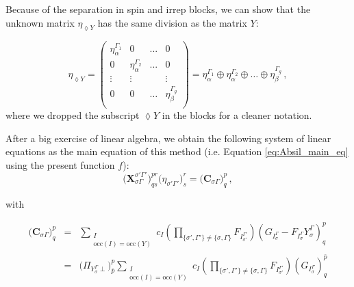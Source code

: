 \documentclass[a4paper,11pt]{article}
\begin{document}
Because of the separation in spin and irrep blocks, we can show that the unknown matrix $\eta_{\lozenge Y}$ has the same division as the matrix $Y$:

\begin{equation}\label{eq:eta_spin_irrep_blocks}
  \eta_{\lozenge Y} =
  \begin{pmatrix}
    \eta_\alpha^{\Gamma_1} & 0 & ... & 0\\
    0 & \eta_\alpha^{\Gamma_2} & ... & 0 \\
    \vdots & \vdots & & \vdots\\
    0 & 0 &\dots & \eta_\beta^{\Gamma_g}\\
  \end{pmatrix}
  = \eta_\alpha^{\Gamma_1} \oplus \eta_\alpha^{\Gamma_2} \oplus \dots \oplus \eta_\beta^{\Gamma_g}\,,
\end{equation}
where we dropped the subscript $\lozenge Y$ in the blocks for a cleaner notation.

After a big exercise of linear algebra, we obtain the following system of linear equations as the main equation of this method (i.e. Equation \ref{eq:Absil_main_eq} using the present function $f$):
\begin{equation}
  \big( \mathbf{X}_{\sigma \Gamma}^{\sigma' \Gamma'} \big)^{pr}_{qs} \big( \eta_{\sigma' \Gamma'} \big)^r_s
  = \big( \mathbf{C}_{\sigma \Gamma} \big)^p_q\,,
\end{equation}

with

\begin{eqnarray}
  \big( \mathbf{C}_{\sigma \Gamma} \big)^p_q &=&
  \sum_{\substack{I\\\text{occ}(I) = \text{occ}(Y)}} c_I
  \left( \prod_{\{\sigma', \Gamma'\} \ne \{\sigma, \Gamma\}} F_{I_{\sigma'}^{\Gamma'}} \right)
  \left( G_{I_\sigma^\Gamma} - F_{I_\sigma^\Gamma} Y_\sigma^\Gamma  \right)^p_q\\
  &=&
  \big( \Pi_{Y_\sigma^\Gamma \perp} \big)^p_{\bar{p}}
  \sum_{\substack{I\\\text{occ}(I) = \text{occ}(Y)}} c_I
  \left( \prod_{\{\sigma', \Gamma'\} \ne \{\sigma, \Gamma\}} F_{I_{\sigma'}^{\Gamma'}} \right)
  \left( G_{I_\sigma^\Gamma} \right)^{\bar{p}}_q
\end{eqnarray}
\end{document}
